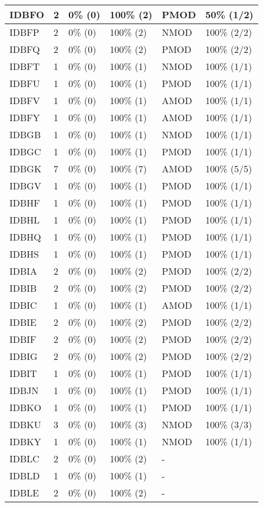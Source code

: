 \begin{figure*}
\begin{tabular}{|l|l|l|l||l|l|}
\hline
 IDBFO & 2 & 0\% (0) & 100\% (2) & PMOD & 50\% (1/2) \\ 
\hline
 IDBFP & 2 & 0\% (0) & 100\% (2) & NMOD & 100\% (2/2) \\ 
\hline
 IDBFQ & 2 & 0\% (0) & 100\% (2) & PMOD & 100\% (2/2) \\ 
\hline
 IDBFT & 1 & 0\% (0) & 100\% (1) & NMOD & 100\% (1/1) \\ 
\hline
 IDBFU & 1 & 0\% (0) & 100\% (1) & PMOD & 100\% (1/1) \\ 
\hline
 IDBFV & 1 & 0\% (0) & 100\% (1) & AMOD & 100\% (1/1) \\ 
\hline
 IDBFY & 1 & 0\% (0) & 100\% (1) & AMOD & 100\% (1/1) \\ 
\hline
 IDBGB & 1 & 0\% (0) & 100\% (1) & NMOD & 100\% (1/1) \\ 
\hline
 IDBGC & 1 & 0\% (0) & 100\% (1) & PMOD & 100\% (1/1) \\ 
\hline
 IDBGK & 7 & 0\% (0) & 100\% (7) & AMOD & 100\% (5/5) \\ 
\hline
 IDBGV & 1 & 0\% (0) & 100\% (1) & PMOD & 100\% (1/1) \\ 
\hline
 IDBHF & 1 & 0\% (0) & 100\% (1) & PMOD & 100\% (1/1) \\ 
\hline
 IDBHL & 1 & 0\% (0) & 100\% (1) & PMOD & 100\% (1/1) \\ 
\hline
 IDBHQ & 1 & 0\% (0) & 100\% (1) & PMOD & 100\% (1/1) \\ 
\hline
 IDBHS & 1 & 0\% (0) & 100\% (1) & PMOD & 100\% (1/1) \\ 
\hline
 IDBIA & 2 & 0\% (0) & 100\% (2) & PMOD & 100\% (2/2) \\ 
\hline
 IDBIB & 2 & 0\% (0) & 100\% (2) & PMOD & 100\% (2/2) \\ 
\hline
 IDBIC & 1 & 0\% (0) & 100\% (1) & AMOD & 100\% (1/1) \\ 
\hline
 IDBIE & 2 & 0\% (0) & 100\% (2) & PMOD & 100\% (2/2) \\ 
\hline
 IDBIF & 2 & 0\% (0) & 100\% (2) & PMOD & 100\% (2/2) \\ 
\hline
 IDBIG & 2 & 0\% (0) & 100\% (2) & PMOD & 100\% (2/2) \\ 
\hline
 IDBIT & 1 & 0\% (0) & 100\% (1) & PMOD & 100\% (1/1) \\ 
\hline
 IDBJN & 1 & 0\% (0) & 100\% (1) & PMOD & 100\% (1/1) \\ 
\hline
 IDBKO & 1 & 0\% (0) & 100\% (1) & PMOD & 100\% (1/1) \\ 
\hline
 IDBKU & 3 & 0\% (0) & 100\% (3) & NMOD & 100\% (3/3) \\ 
\hline
 IDBKY & 1 & 0\% (0) & 100\% (1) & NMOD & 100\% (1/1) \\ 
\hline
 IDBLC & 2 & 0\% (0) & 100\% (2) & - &  \\ 
\hline
 IDBLD & 1 & 0\% (0) & 100\% (1) & - &  \\ 
\hline
 IDBLE & 2 & 0\% (0) & 100\% (2) & - &  \\ 
\hline
\end{tabular}
\end{figure*}
